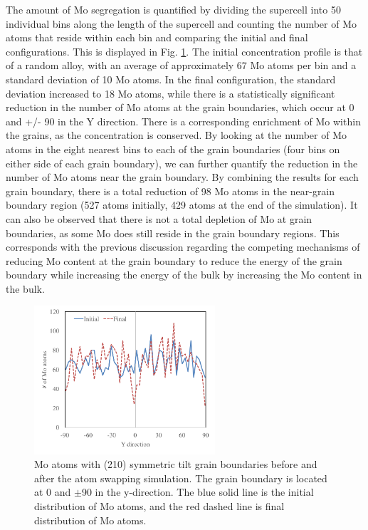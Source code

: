 \documentclass[review]{elsarticle}
\begin{document}
The amount of Mo segregation is quantified by dividing the supercell into 50 individual bins along the length of the supercell and counting the number of Mo atoms that reside within each bin and comparing the initial and final configurations. This is displayed in Fig. \ref{fig:600mcmdA}. The initial concentration profile is that of a random alloy, with an average of approximately 67 Mo atoms per bin and a standard deviation of 10 Mo atoms. In the final configuration, the standard deviation increased to 18 Mo atoms, while there is a statistically significant reduction in the number of Mo atoms at the grain boundaries, which occur at 0 and +/- 90 in the Y direction. There is a corresponding enrichment of Mo within the grains, as the concentration is conserved. By looking at the number of Mo atoms in the eight nearest bins to each of the grain boundaries (four bins on either side of each grain boundary), we can further quantify the reduction in the number of Mo atoms near the grain boundary. By combining the results for each grain boundary, there is a total reduction of 98 Mo atoms in the near-grain boundary region (527 atoms initially, 429 atoms at the end of the simulation). It can also be observed that there is not a total depletion of Mo at grain boundaries, as some Mo does still reside in the grain boundary regions. This corresponds with the previous discussion regarding the competing mechanisms of reducing Mo content at the grain boundary to reduce the energy of the grain boundary while increasing the energy of the bulk by increasing the Mo content in the bulk.

\begin{figure}[h]
 \centering
 \includegraphics[width=0.6\textwidth]{600mcmdA.png} 
 \caption{Mo atoms with (210) symmetric tilt grain boundaries before and after the atom swapping simulation. The grain boundary is located at 0 and $\pm$90 in the y-direction. The blue solid line is the initial distribution of Mo atoms, and the red dashed line is final distribution of Mo atoms.}
 \label{fig:600mcmdA}
\end{figure}
\end{document}
